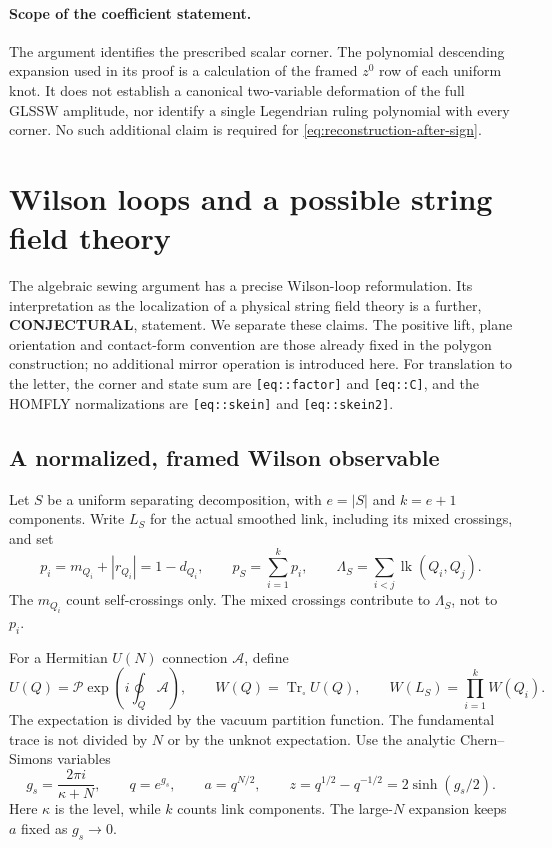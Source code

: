 \documentclass[11pt,letterpaper]{article}
\numberwithin{equation}{section}
\theoremstyle{definition}
\theoremstyle{remark}
\begin{document}
\paragraph{Scope of the coefficient statement.}
The argument identifies the prescribed scalar corner. The polynomial
descending expansion used in its proof is a calculation of the framed
\(z^0\) row of each uniform knot. It does not establish a canonical
two-variable deformation of the full GLSSW amplitude, nor identify a
single Legendrian ruling polynomial with every corner. No such additional
claim is required for \eqref{eq:reconstruction-after-sign}.

\section{Wilson loops and a possible string field theory}
\label{sec:physics}

The algebraic sewing argument has a precise Wilson-loop reformulation.
Its interpretation as the localization of a physical string field theory
is a further, \textbf{CONJECTURAL}, statement. We separate these claims.
The positive lift, plane orientation and contact-form convention are those
already fixed in the polygon construction; no additional mirror operation
is introduced here. For translation to the letter, the corner and state
sum are \texttt{[eq::factor]} and \texttt{[eq::C]}, and the HOMFLY
normalizations are \texttt{[eq::skein]} and \texttt{[eq::skein2]}.

\subsection{A normalized, framed Wilson observable}

Let $S$ be a uniform separating decomposition, with $e=|S|$ and $k=e+1$
components. Write $L_S$ for the actual smoothed link, including its mixed
crossings, and set
\begin{equation}
 p_i=m_{Q_i}+|r_{Q_i}|=1-d_{Q_i},\qquad
 p_S=\sum_{i=1}^k p_i,\qquad
 \Lambda_S=\sum_{i<j}\operatorname{lk}(Q_i,Q_j).
 \label{phys:framing-data}
\end{equation}
The $m_{Q_i}$ count self-crossings only. The mixed crossings contribute
to $\Lambda_S$, not to $p_i$.

For a Hermitian $U(N)$ connection $\mathscr A$, define
\begin{equation}
 U(Q)=\mathcal P\exp\!\left(i\oint_Q\mathscr A\right),\qquad
 W(Q)=\operatorname{Tr}_{\square}U(Q),\qquad
 W(L_S)=\prod_{i=1}^k W(Q_i).
 \label{phys:Wilson-operator}
\end{equation}
The expectation is divided by the vacuum partition function. The
fundamental trace is not divided by $N$ or by the unknot expectation.
Use the analytic Chern--Simons variables
\begin{equation}
 g_s=\frac{2\pi i}{\kappa+N},\qquad q=e^{g_s},\qquad
 a=q^{N/2},\qquad z=q^{1/2}-q^{-1/2}=2\sinh(g_s/2).
 \label{phys:variables}
\end{equation}
Here $\kappa$ is the level, while $k$ counts link components. The
large-$N$ expansion keeps $a$ fixed as $g_s\to0$.
\end{document}
